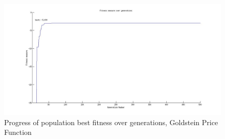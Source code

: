 \documentclass[ExampleMasters.tex]{subfiles}
\begin{document}
			\begin{figure}[hb!]
				\centering
				\includegraphics[width=\textwidth]{figures/GeneticAlgorithm/GPR_fitness_vs_generation.jpg}
				\caption{Progress of population best fitness over generations, Goldstein Price Function}
				\label{GPRF}
			\end{figure}
\end{document}
